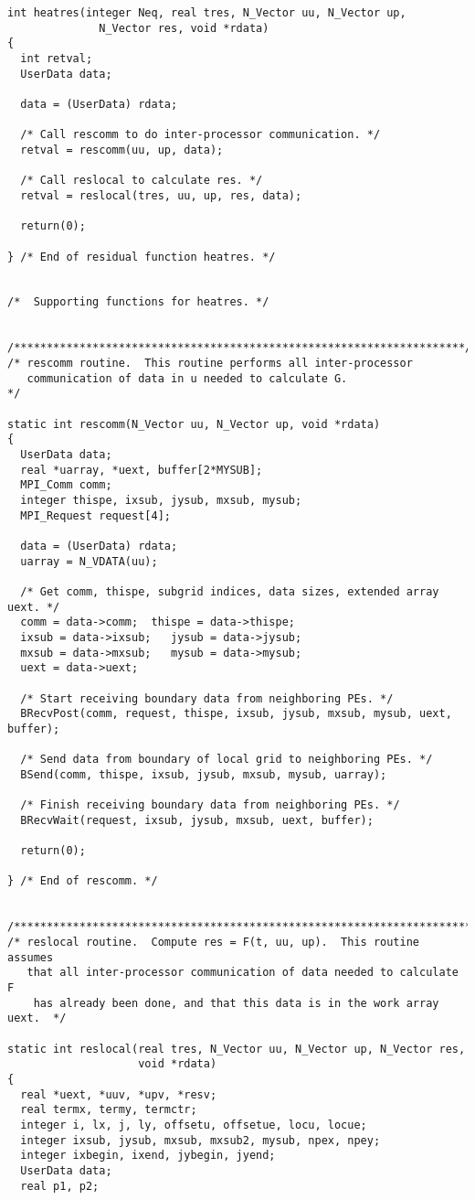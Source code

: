 \begin{verbatim}
int heatres(integer Neq, real tres, N_Vector uu, N_Vector up,
              N_Vector res, void *rdata)
{
  int retval;
  UserData data;

  data = (UserData) rdata;

  /* Call rescomm to do inter-processor communication. */
  retval = rescomm(uu, up, data);

  /* Call reslocal to calculate res. */
  retval = reslocal(tres, uu, up, res, data);
  
  return(0);

} /* End of residual function heatres. */


/*  Supporting functions for heatres. */


/*********************************************************************/
/* rescomm routine.  This routine performs all inter-processor
   communication of data in u needed to calculate G.                 */

static int rescomm(N_Vector uu, N_Vector up, void *rdata)
{
  UserData data;
  real *uarray, *uext, buffer[2*MYSUB];
  MPI_Comm comm;
  integer thispe, ixsub, jysub, mxsub, mysub;
  MPI_Request request[4];

  data = (UserData) rdata;
  uarray = N_VDATA(uu);

  /* Get comm, thispe, subgrid indices, data sizes, extended array uext. */
  comm = data->comm;  thispe = data->thispe;
  ixsub = data->ixsub;   jysub = data->jysub;
  mxsub = data->mxsub;   mysub = data->mysub;
  uext = data->uext;

  /* Start receiving boundary data from neighboring PEs. */
  BRecvPost(comm, request, thispe, ixsub, jysub, mxsub, mysub, uext, buffer);

  /* Send data from boundary of local grid to neighboring PEs. */
  BSend(comm, thispe, ixsub, jysub, mxsub, mysub, uarray);

  /* Finish receiving boundary data from neighboring PEs. */
  BRecvWait(request, ixsub, jysub, mxsub, uext, buffer);

  return(0);

} /* End of rescomm. */


/**************************************************************************/
/* reslocal routine.  Compute res = F(t, uu, up).  This routine assumes
   that all inter-processor communication of data needed to calculate F
    has already been done, and that this data is in the work array uext.  */

static int reslocal(real tres, N_Vector uu, N_Vector up, N_Vector res,
                    void *rdata)
{
  real *uext, *uuv, *upv, *resv;
  real termx, termy, termctr;
  integer i, lx, j, ly, offsetu, offsetue, locu, locue;
  integer ixsub, jysub, mxsub, mxsub2, mysub, npex, npey;
  integer ixbegin, ixend, jybegin, jyend;
  UserData data;
  real p1, p2;


\end{verbatim}

